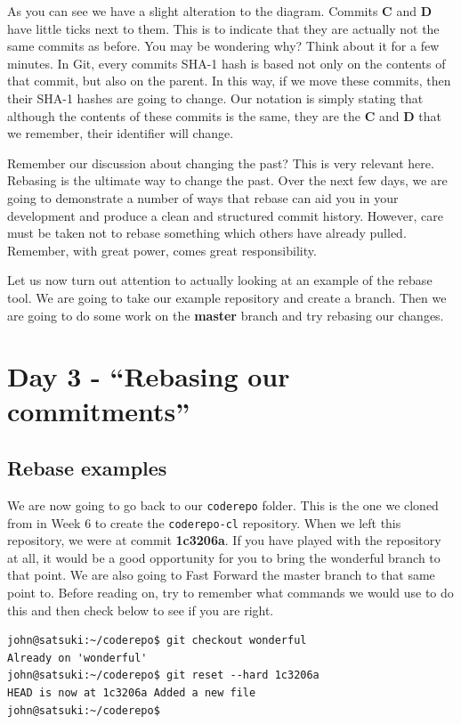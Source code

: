 As you can see we have a slight alteration to the diagram.
Commits \textbf{C} and \textbf{D} have little ticks next to them.
This is to indicate that they are actually not the same commits as before.
You may be wondering why? Think about it for a few minutes.
In Git, every commits SHA-1 hash is based not only on the contents of that commit, but also on the parent.
In this way, if we move these commits, then their SHA-1 hashes are going to change.
Our notation is simply stating that although the contents of these commits is the same, they are the \textbf{C} and \textbf{D} that we remember, their identifier will change.

Remember our discussion about changing the past? This is very relevant here.
Rebasing is the ultimate way to change the past.
Over the next few days, we are going to demonstrate a number of ways that rebase can aid you in your development and produce a clean and structured commit history.
However, care must be taken not to rebase something which others have already pulled.
Remember, with great power, comes great responsibility.

Let us now turn out attention to actually looking at an example of the rebase tool.
We are going to take our example repository and create a branch.
Then we are going to do some work on the \textbf{master} branch and try rebasing our changes.

\section{Day 3 - ``Rebasing our commitments''}
\subsection{Rebase examples}

We are now going to go back to our \texttt{coderepo} folder.
This is the one we cloned from in Week 6 to create the \texttt{coderepo-cl} repository.
When we left this repository, we were at commit \textbf{1c3206a}.
If you have played with the repository at all, it would be a good opportunity for you to bring the wonderful branch to that point.
We are also going to Fast Forward the master branch to that same point to.
Before reading on, try to remember what commands we would use to do this and then check below to see if you are right.

\begin{Verbatim}
john@satsuki:~/coderepo$ git checkout wonderful
Already on 'wonderful'
john@satsuki:~/coderepo$ git reset --hard 1c3206a
HEAD is now at 1c3206a Added a new file
john@satsuki:~/coderepo$
\end{Verbatim}

